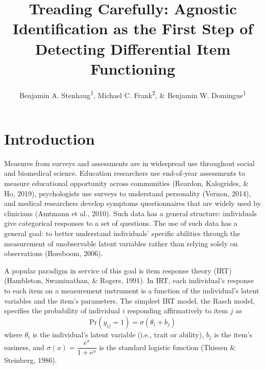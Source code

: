 \documentclass[
  english,
  man,floatsintext]{apa6}
\title{Treading Carefully: Agnostic Identification as the First Step of Detecting Differential Item Functioning}
\author{Benjamin A. Stenhaug\textsuperscript{1}, Michael C. Frank\textsuperscript{2}, \& Benjamin W. Domingue\textsuperscript{1}}
\date{}
\affiliation{\vspace{0.5cm}\textsuperscript{1} The Graduate School of Education, Stanford University\\\textsuperscript{2} Department of Psychology, Stanford University}
\begin{document}
\maketitle

\hypertarget{intro}{%
\section{Introduction}\label{intro}}

Measures from surveys and assessments are in widespread use throughout social and biomedical science. Education researchers use end-of-year assessments to measure educational opportunity across communities (Reardon, Kalogrides, \& Ho, 2019), psychologists use surveys to understand personality (Vernon, 2014), and medical researchers develop symptoms questionnaires that are widely used by clinicians (Amtmann et al., 2010). Such data has a general structure: individuals give categorical responses to a set of questions. The use of such data has a general goal: to better understand individuals' specific abilities through the measurement of unobservable latent variables rather than relying solely on observations (Borsboom, 2006).

A popular paradigm in service of this goal is item response theory (IRT) (Hambleton, Swaminathan, \& Rogers, 1991). In IRT, each individual's response to each item on a measurement instrument is a function of the individual's latent variables and the item's parameters. The simplest IRT model, the Rasch model, specifies the probability of individual \(i\) responding affirmatively to item \(j\) as
\begin{equation}
\text{Pr}(y_{ij} = 1) = \sigma(\theta_i + b_j)
\end{equation}
where \(\theta_i\) is the individual's latent variable (i.e., trait or ability), \(b_j\) is the item's easiness, and \(\sigma(x) = \dfrac{e^x}{1 + e^x}\) is the standard logistic function (Thissen \& Steinberg, 1986).
\end{document}
